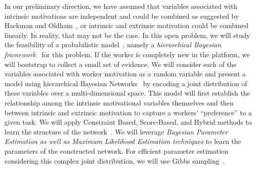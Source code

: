  In our preliminary direction, we have assumed that variables associated with intrinsic motivations are independent and could be combined as suggested by Hackman and Oldham~\cite{hackman1976motivation}, or intrinsic and extrinsic motivation could be combined linearly. In reality, that may not be the case. In this open problem, we will study the feasibility of a probabilistic model~\cite{zhao2012bayesian}, namely a {\em hierarchical Bayesian framework}~\cite{liu2014framework} for this problem. If the worker is completely new in the platform, we will bootstrap to collect a small set of evidence. We will consider each of the variables associated with worker motivation as a random variable and present a model using hierarchical Bayesian Networks~\cite{jensen1996introduction} by encoding a joint distribution of these variables over a multi-dimensional space.  This model will first establish the relationship among the intrinsic motivational variables themselves and then between intrinsic and extrinsic motivation to capture a workers' ``preference'' to a given task. We will apply Constraint Based, Score-Based, and Hybrid methods to learn the structure of the network~\cite{tsamardinos2006max}. We will leverage {\em Bayesian Parameter Estimation as well as Maximum Likelihood Estimation techniques} to learn the parameters of the constructed network. For efficient parameter estimation considering this complex joint distribution, we will use Gibbs sampling~\cite{carter1994gibbs}. 







